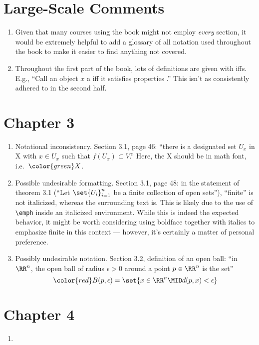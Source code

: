 \documentclass{fkletter}
\begin{document}
\section*{Large-Scale Comments}
\begin{enumerate}
  \item Given that many courses using the book might not employ \emph{every}
    section, it would be extremely helpful to add a glossary of all notation
    used throughout the book to make it easier to find anything not covered.
  \item Throughout the first part of the book, lots of definitions are given
    with iffs. E.g., ``Call an object $x$ a \underline{\phantom{thingy}} iff it
    satisfies properties \underline{\phantom{llist of properties}}.'' This isn't
    as consistently adhered to in the second half.
\end{enumerate}
\section*{Chapter 3}
\begin{enumerate}
  \item Notational inconsistency. Section 3.1, page 46: ``there is a designated
    set $U_x$ in {\color{red} X} with $x \in U_x$ such that $f(U_x) \subset
    V$.'' Here, the {\color{red} X} should be in math font, i.e.\
    ${\color{green} X}$.
  \item Possible undesirable formatting. Section 3.1, page 48: in the statement
    of theorem 3.1 (``Let $\set{U_i}_{i=1}^n$ be a finite collection of open
    sets''), ``finite'' is not italicized, whereas the surrounding text is. This
    is likely due to the use of \verb|\emph| inside an italicized environment.
    {\color{red} While this is indeed the expected behavior, it might be worth
      considering using boldface together with italics to emphasize finite in
      this context --- however, it's certainly a matter of personal preference.}
  \item Possibly undesirable notation. Section 3.2, definition of an open ball:
    ``in $\RR^n$, the open ball of radius $\epsilon > 0$ around a point $p \in
    \RR^n$ is the set''
    \[
      {\color{red}B(p,\epsilon)} = \set{x \in \RR^n \MID d(p,x) < \epsilon}
    \]
\end{enumerate}
\section*{Chapter 4}
\begin{enumerate}
  \item
\end{enumerate}
\end{document}

